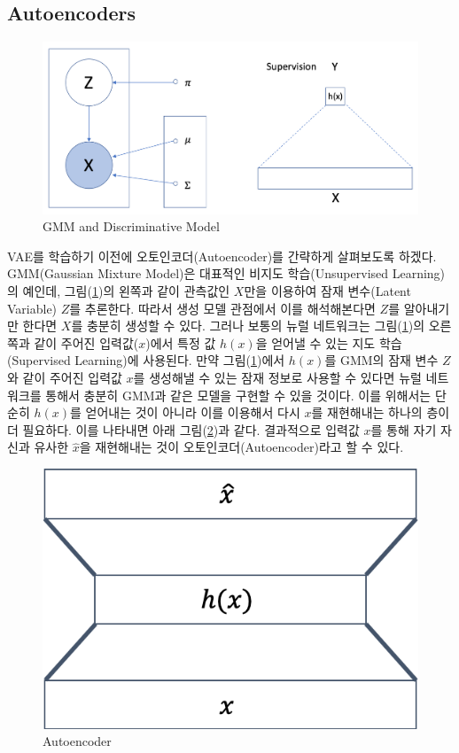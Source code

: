 \documentclass[draft=false]{oblivoir}
\begin{document}
\subsection{Autoencoders}
\begin{figure}[ht] \centering
  \includegraphics[scale=0.3]{fig2.png}
  \caption{GMM and Discriminative Model}
  \label{fig:17-2}
\end{figure}
VAE를 학습하기 이전에 오토인코더(Autoencoder)를 간략하게 살펴보도록 하겠다. GMM(Gaussian Mixture Model)은 대표적인 비지도 학습(Unsupervised Learning)의 예인데, 그림(\ref{fig:17-2})의 왼쪽과 같이 관측값인 $X$만을 이용하여 잠재 변수(Latent Variable) $Z$를 추론한다. 따라서 생성 모델 관점에서 이를 해석해본다면 $Z$를 알아내기만 한다면 $X$를 충분히 생성할 수 있다. 그러나 보통의 뉴럴 네트워크는 그림(\ref{fig:17-2})의 오른쪽과 같이 주어진 입력값($x$)에서 특정 값 $h(x)$을 얻어낼 수 있는 지도 학습(Supervised Learning)에 사용된다. 만약 그림(\ref{fig:17-2})에서 $h(x)$를 GMM의 잠재 변수 $Z$와 같이 주어진 입력값 $x$를 생성해낼 수 있는 잠재 정보로 사용할 수 있다면 뉴럴 네트워크를 통해서 충분히 GMM과 같은 모델을 구현할 수 있을 것이다. 이를 위해서는 단순히 $h(x)$를 얻어내는 것이 아니라 이를 이용해서 다시 $x$를 재현해내는 하나의 층이 더 필요하다. 이를 나타내면 아래 그림(\ref{fig:17-3})과 같다. 결과적으로 입력값 $x$를 통해 자기 자신과 유사한 $\hat{x}$을 재현해내는 것이 오토인코더(Autoencoder)라고 할 수 있다.
\begin{figure}[ht] \centering
  \includegraphics[scale=0.7]{fig3.png}
  \caption{Autoencoder}
  \label{fig:17-3}
\end{figure}
\end{document}

